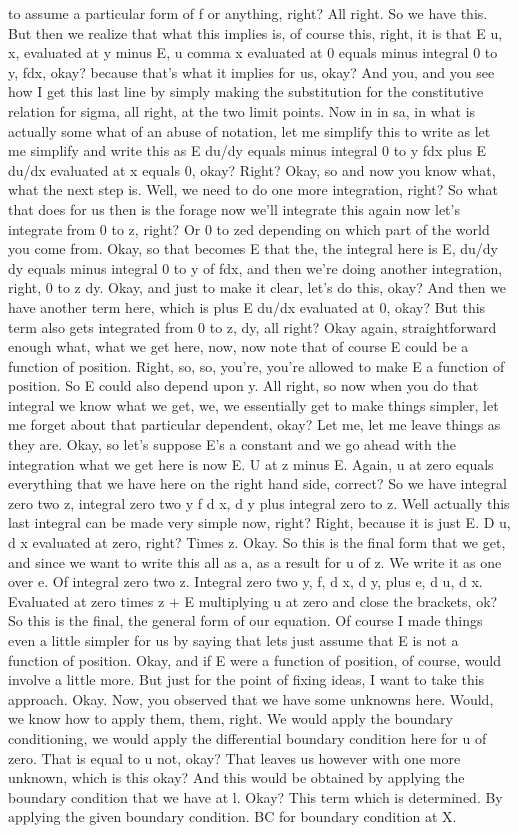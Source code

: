 \documentclass[10pt]{article}
\begin{document}
to assume a particular form of f or anything, right? All right. So we have this. But then we realize that what this implies is, of course this, right, it is that E u, x, evaluated at y minus E, u comma x evaluated at 0 equals minus integral 0 to y, fdx, okay? because that's what it implies for us, okay? And you, and you see how I get this last line by simply making the substitution for the constitutive relation for sigma, all right, at the two limit points. Now in in sa, in what is actually some what of an abuse of notation, let me simplify this to write as let me simplify and write this as E du/dy equals minus integral 0 to y fdx plus E du/dx evaluated at x equals 0, okay? Right? Okay, so and now you know what, what the next step is. Well, we need to do one more integration, right? So what that does for us then is the forage now we'll integrate this again now let's integrate from 0 to z, right? Or 0 to zed depending on which part of the world you come from. Okay, so that becomes E that the, the integral here is E, du/dy dy equals minus integral 0 to y of fdx, and then we're doing another integration, right, 0 to z dy. Okay, and just to make it clear, let's do this, okay? And then we have another term here, which is plus E du/dx evaluated at 0, okay? But this term also gets integrated from 0 to z, dy, all right? Okay again, straightforward enough what, what we get here, now, now note that of course E could be a function of position. Right, so, so, you're, you're allowed to make E a function of position. So E could also depend upon y. All right, so now when you do that integral we know what we get, we, we essentially get to make things simpler, let me forget about that particular dependent, okay? Let me, let me leave things as they are. Okay, so let's suppose E's a constant and we go ahead with the integration what we get here is now E. U at z minus E. Again, u at zero equals everything that we have here on the right hand side, correct? So we have integral zero two z, integral zero two y f d x, d y plus integral zero to z. Well actually this last integral can be made very simple now, right? Right, because it is just E. D u, d x evaluated at zero, right? Times z. Okay. So this is the final form that we get, and since we want to write this all as a, as a result for u of z. We write it as one over e. Of integral zero two z. Integral zero two y, f, d x, d y, plus e, d u, d x. Evaluated at zero times z + E multiplying u at zero and close the brackets, ok? So this is the final, the general form of our equation. Of course I made things even a little simpler for us by saying that lets just assume that E is not a function of position. Okay, and if E were a function of position, of course, would involve a little more. But just for the point of fixing ideas, I want to take this approach. Okay. Now, you observed that we have some unknowns here. Would, we know how to apply them, them, right. We would apply the boundary conditioning, we would apply the differential boundary condition here for u of zero. That is equal to u not, okay? That leaves us however with one more unknown, which is this okay? And this would be obtained by applying the boundary condition that we have at l. Okay? This term which is determined. By applying the given boundary condition. BC for boundary condition at X. 
\end{document}
